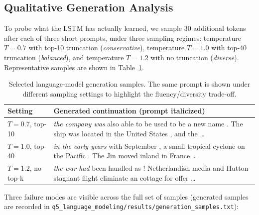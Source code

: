 \documentclass[11pt,a4paper]{article}
\begin{document}
\subsection{Qualitative Generation Analysis}

To probe what the LSTM has actually learned, we sample 30 additional
tokens after each of three short prompts, under three sampling
regimes: temperature $T=0.7$ with top-10 truncation (\emph{conservative}),
temperature $T=1.0$ with top-40 truncation (\emph{balanced}), and
temperature $T=1.2$ with no truncation (\emph{diverse}). Representative
samples are shown in Table~\ref{tab:q5-samples}.

\begin{table}[H]
\centering
\caption{Selected language-model generation samples. The same prompt is
shown under different sampling settings to highlight the
fluency/diversity trade-off.}
\label{tab:q5-samples}
\renewcommand{\arraystretch}{1.25}
\small
\begin{tabular}{p{} p{}}
\toprule
\textbf{Setting} & \textbf{Generated continuation (prompt italicized)} \\
\midrule
$T{=}0.7$, top-10
  & \emph{the company was} also able to be used to be a new name . The ship was located in the United States , and the \ldots \\
$T{=}1.0$, top-40
  & \emph{in the early years} with September , a small tropical cyclone on the Pacific . The Jin moved inland in France \ldots \\
$T{=}1.2$, no top-k
  & \emph{the war had} been handled as ! Netherlandish media and Hutton stagnant flight eliminate an cottage for offer \ldots \\
\bottomrule
\end{tabular}
\end{table}

Three failure modes are visible across the full set of samples
(generated samples are recorded in
\texttt{q5\_language\_modeling/results/generation\_samples.txt}):
\end{document}
